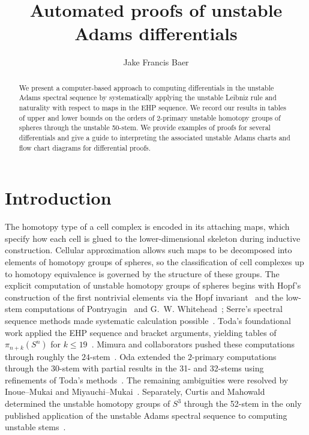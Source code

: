 \documentclass[dvipsnames,table]{amsart}
\title{Automated proofs of unstable Adams differentials}
\author{Jake Francis Baer}
\theoremstyle{definition}
\theoremstyle{remark}
\numberwithin{equation}{section}
\begin{document}
\begin{abstract}

\noindent We present a computer-based approach to computing 
differentials in the unstable Adams spectral sequence by systematically
applying the unstable Leibniz rule and naturality with respect to maps in the EHP sequence. We record our results in tables of upper and lower bounds on the orders of 2-primary unstable homotopy groups of spheres through the unstable 50-stem. We provide examples of proofs for several differentials and give a guide to interpreting the associated unstable Adams charts and flow chart diagrams for differential proofs. \end{abstract}

\maketitle

\setcounter{tocdepth}{1}
\tableofcontents

\section{Introduction}
\noindent The homotopy type of a cell complex is encoded in its attaching maps, which specify how each cell is glued to the lower-dimensional skeleton during inductive construction. Cellular approximation allows such maps to be decomposed into elements of homotopy groups of spheres, so the classification of cell complexes up to homotopy equivalence is governed by the structure of these groups.
The explicit computation of unstable homotopy groups of spheres begins with Hopf's construction of the first nontrivial elements via the Hopf invariant~\cite{Hopf1931} and the low-stem computations of Pontryagin~\cite{Pontrjagin_1938} and G.~W. Whitehead~\cite{Whitehead_GW_1950}; Serre's spectral sequence methods made systematic calculation possible~\cite{Serre1953}. Toda’s foundational work applied the EHP sequence and bracket arguments, yielding tables of $\pi_{n+k}(S^n)$ for $k\leq 19$~\cite{Toda_1962}. Mimura and collaborators pushed these computations through roughly the $24$-stem~\cite{MimuraToda1963, Mimura1964, Mimura1965, MimuraMoriOda1975}. Oda extended the $2$-primary computations through the 30-stem with partial results in the 31- and 32-stems using refinements of Toda’s methods~\cite{Oda1976, Oda1977}. The remaining ambiguities were resolved by Inoue--Mukai and Miyauchi--Mukai~\cite{InoueMukai2012, MiyauchiMukai2017}. Separately, Curtis and Mahowald determined the unstable homotopy groups of $S^3$ through the 52-stem in the only published application of the unstable Adams spectral sequence to computing unstable stems~\cite{Curtis_Mahowald_1989}. 
\end{document}
